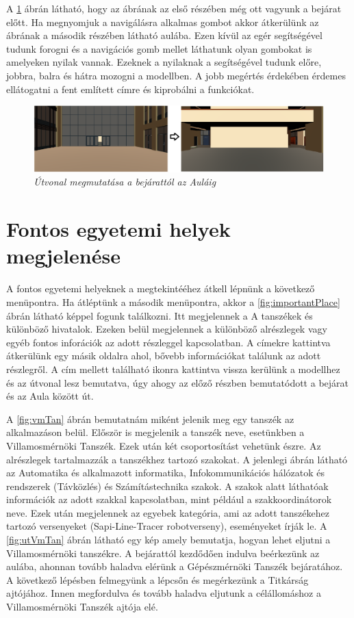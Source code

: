 A \ref{fig:bejartaAula} ábrán látható, hogy az ábrának az első részében még ott vagyunk a bejárat előtt. Ha megnyomjuk a navigálásra alkalmas gombot akkor átkerülünk az ábrának a második részében látható aulába. Ezen kívül az egér segítségével tudunk forogni és a navigációs gomb mellet láthatunk olyan gombokat is amelyeken nyilak vannak. Ezeknek a nyilaknak a segítségével tudunk előre, jobbra, balra és hátra mozogni a modellben. A jobb megértés érdekében érdemes ellátogatni a fent említett címre és kiprobálni a funkciókat.

\begin{figure}[H]
	\centering
	\includegraphics[width=0.9\linewidth]{figures/images/bejaratAula.png}
	\caption[Útvonal megmutatása a bejárattól az Auláig]{\textit{Útvonal megmutatása a bejárattól az Auláig}}
	\label{fig:bejartaAula}
\end{figure} 

\section{Fontos egyetemi helyek megjelenése}

A fontos egyetemi helyeknek a megtekintééhez átkell lépnünk a következő menüpontra. Ha átléptünk a második menüpontra, akkor a \ref{fig:importantPlace} ábrán látható képpel fogunk találkozni. Itt megjelennek a A tanszékek és különböző hivatalok. Ezeken belül megjelennek a különböző alrészlegek vagy egyéb fontos inforációk az adott részleggel kapcsolatban. A címekre kattintva átkerülünk egy másik oldalra ahol, bővebb információkat találunk az adott részlegről. A cím mellett található ikonra kattintva vissza kerülünk a modellhez és az útvonal lesz bemutatva, úgy ahogy az előző részben bemutatódott a bejárat és az Aula között út.

A \ref{fig:vmTan} ábrán bemutatnám miként jelenik meg egy tanszék az alkalmazáson belül. Először is megjelenik a tanszék neve, esetünkben a Villamosmérnöki Tanszék. Ezek után két csoportosítást vehetünk észre. Az alrészlegek tartalmazzák a tanszékhez tartozó szakokat. A jelenlegi ábrán látható az Automatika és alkalmazott informatika, Infokommunikációs hálózatok és rendszerek (Távközlés) és Számítástechnika szakok. A szakok alatt láthatóak információk az adott szakkal kapcsolatban, mint például a szakkoordinátorok neve. Ezek után megjelennek az egyebek kategória, ami az adott tanszékehez tartozó versenyeket (Sapi-Line-Tracer robotverseny), eseményeket írják le. A \ref{fig:utVmTan} ábrán látható egy kép amely bemutatja, hogyan lehet eljutni a Villamosmérnöki tanszékre. A bejárattól kezdődően indulva beérkezünk az aulába, ahonnan tovább haladva elérünk a Gépészmérnöki Tanszék bejáratához. A következő lépésben felmegyünk a lépcsőn és megérkezünk a Titkárság ajtójához. Innen megfordulva és tovább haladva eljutunk a célállomáshoz a Villamosmérnöki Tanszék ajtója elé.

